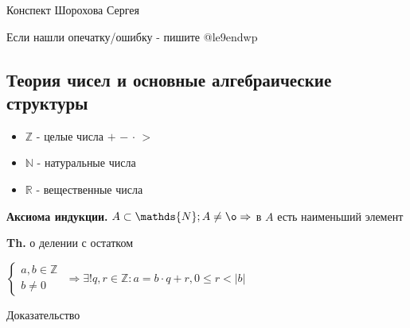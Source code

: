 \documentclass[14pt, letter paper]{article}
\begin{document}
\begin{flushright}
    Конспект Шорохова Сергея

    Если нашли опечатку/ошибку - пишите @le9endwp
\end{flushright}

\begin{center}
    \section*{Теория чисел и основные алгебраические структуры}
\end{center}

\begin{itemize}
    \item $\mathds{Z}$ - целые числа $+$ $-$ $\cdot$ $>$
    \item $\mathds{N}$ - натуральные числа
    \item $\mathds{R}$ - вещественные числа
\end{itemize}

\textbf{Аксиома индукции.} $A \subset \mathds{N}; A \neq \o \Rightarrow$ в $A$ есть наименьший элемент

\textbf{Th.} о делении с остатком

$\begin{cases}
    a, b \in \mathds{Z} \\
    b \neq 0
\end{cases}$
$\Rightarrow \exists ! q, r \in \mathds{Z}: a = b \cdot q + r, 0 \leq r < |b|$

\begin{center}
    Доказательство
\end{center}
\end{document}
